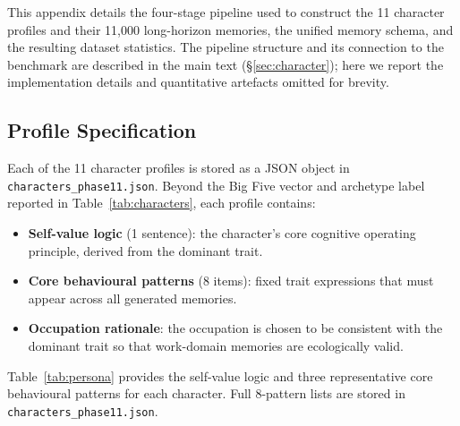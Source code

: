 This appendix details the four-stage pipeline used to construct the 11 character profiles and their 11{,}000 long-horizon memories, the unified memory schema, and the resulting dataset statistics. The pipeline structure and its connection to the benchmark are described in the main text (\S\ref{sec:character}); here we report the implementation details and quantitative artefacts omitted for brevity.

\subsection{Profile Specification}
\label{app:stage_a}

Each of the 11 character profiles is stored as a JSON object in \texttt{characters\_phase11.json}. Beyond the Big Five vector and archetype label reported in Table~\ref{tab:characters}, each profile contains:

\begin{itemize}[leftmargin=1.5em, itemsep=2pt]
  \item \textbf{Self-value logic} (1 sentence): the character's core cognitive operating principle, derived from the dominant trait.
  \item \textbf{Core behavioural patterns} (8 items): fixed trait expressions that must appear across all generated memories.
  \item \textbf{Occupation rationale}: the occupation is chosen to be consistent with the dominant trait so that work-domain memories are ecologically valid.
\end{itemize}

Table~\ref{tab:persona} provides the self-value logic and three representative core behavioural patterns for each character. Full 8-pattern lists are stored in \texttt{characters\_phase11.json}.

